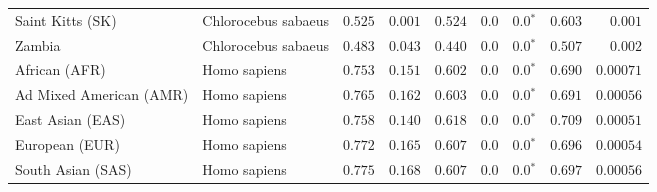 \begin{center}
\begin{adjustbox}{width = 1\textwidth}
\begin{tabular}{|l|l|r|r|r|r|r|r|r|}
            Saint Kitts (SK)                  & Chlorocebus sabaeus        & $ 0.525$ & $ 0.001$ & $ 0.524$ & $0.0$    & $\bm{0.0{^*}}$    & $ 0.603$ & $ 0.001$ \\
            Zambia        & Chlorocebus sabaeus        & $ 0.483$ & $ 0.043$ & $ 0.440$ & $0.0$    & $\bm{0.0{^*}}$ & $ 0.507$ & $ 0.002$ \\
            African (AFR)               & Homo sapiens        & $ 0.753$ & $ 0.151$ & $ 0.602$ & $0.0$    & $\bm{0.0{^*}}$    & $ 0.690$ & $0.00071$ \\
            Ad Mixed American (AMR)                 & Homo sapiens        & $ 0.765$ & $ 0.162$ & $ 0.603$ & $0.0$    & $\bm{0.0{^*}}$    & $ 0.691$ & $0.00056$ \\
            East Asian (EAS)              & Homo sapiens        & $ 0.758$ & $ 0.140$ & $ 0.618$ & $0.0$    & $\bm{0.0{^*}}$    & $ 0.709$ & $0.00051$ \\
            European (EUR)              & Homo sapiens        & $ 0.772$ & $ 0.165$ & $ 0.607$ & $0.0$    & $\bm{0.0{^*}}$    & $ 0.696$ & $0.00054$ \\
            South Asian (SAS)              & Homo sapiens        & $ 0.775$ & $ 0.168$ & $ 0.607$ & $0.0$    & $\bm{0.0{^*}}$    & $ 0.697$ & $0.00056$ \\
            \bottomrule
        \end{tabular}
    \end{adjustbox}
\end{center}
